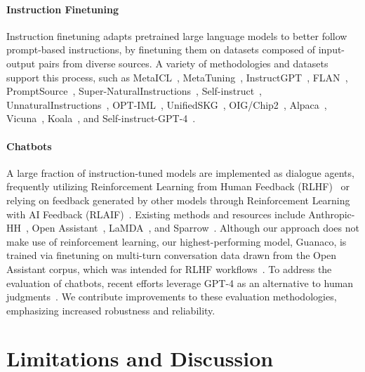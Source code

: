 \paragraph{Instruction Finetuning} Instruction finetuning adapts pretrained large language models to better follow prompt-based instructions, by finetuning them on datasets composed of input-output pairs from diverse sources. A variety of methodologies and datasets support this process, such as MetaICL~\citep{min2021metaicl}, MetaTuning~\citep{zhong2021adapting}, InstructGPT~\citep{ouyang2022training}, FLAN~\citep{wei2021finetuned,chung2022scaling}, PromptSource~\citep{bach2022promptsource}, Super-NaturalInstructions~\citep{wang2022super,sanh2021multitask}, Self-instruct~\citep{wang2022self}, UnnaturalInstructions~\citep{honovich2022unnatural}, OPT-IML~\citep{iyer2022opt}, UnifiedSKG~\citep{xie2022unifiedskg}, OIG/Chip2~\citep{laion2023}, Alpaca~\citep{alpaca}, Vicuna~\citep{vicuna2023}, Koala~\citep{koala_blogpost_2023}, and Self-instruct-GPT-4~\citep{peng2023instruction}.

\paragraph{Chatbots} A large fraction of instruction-tuned models are implemented as dialogue agents, frequently utilizing Reinforcement Learning from Human Feedback (RLHF)~\citep{christiano2017deep} or relying on feedback generated by other models through Reinforcement Learning with AI Feedback (RLAIF)~\citep{bai2022constitutional}. Existing methods and resources include Anthropic-HH~\citep{askell2021general,bai2022training}, Open Assistant~\citep{kopf2023openassistant}, LaMDA~\citep{thoppilan2022lamda}, and Sparrow~\citep{glaese2022improving}. Although our approach does not make use of reinforcement learning, our highest-performing model, Guanaco, is trained via finetuning on multi-turn conversation data drawn from the Open Assistant corpus, which was intended for RLHF workflows~\citep{kopf2023openassistant}. To address the evaluation of chatbots, recent efforts leverage GPT-4 as an alternative to human judgments~\citep{vicuna2023,peng2023instruction}. We contribute improvements to these evaluation methodologies, emphasizing increased robustness and reliability.

\section{Limitations and Discussion}

